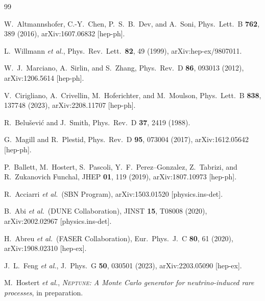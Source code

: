 \documentclass[
  aps,
  prl,
  twocolumn,
  superscriptaddress,
  amsmath, amssymb,
  floatfix, nofootinbib,
  longbibliography,
]{revtex4-2}
\newcommand{\Neptune}{\textsc{Neptune}}
\begin{document}
\begin{thebibliography}{99}

W.~Altmannshofer, C.-Y.~Chen, P.~S.~B.~Dev, and A.~Soni,
Phys.\ Lett.\ B \textbf{762}, 389 (2016),
arXiv:1607.06832 [hep-ph].

L.~Willmann \emph{et al.},
Phys.\ Rev.\ Lett.\ \textbf{82}, 49 (1999),
arXiv:hep-ex/9807011.

W.~J.~Marciano, A.~Sirlin, and S.~Zhang,
Phys.\ Rev.\ D \textbf{86}, 093013 (2012),
arXiv:1206.5614 [hep-ph].

V.~Cirigliano, A.~Crivellin, M.~Hoferichter, and M.~Moulson,
Phys.\ Lett.\ B \textbf{838}, 137748 (2023),
arXiv:2208.11707 [hep-ph].

R.~Belu\v{s}evi\'c and J.~Smith,
Phys.\ Rev.\ D \textbf{37}, 2419 (1988).

G.~Magill and R.~Plestid,
Phys.\ Rev.\ D \textbf{95}, 073004 (2017),
arXiv:1612.05642 [hep-ph].

P.~Ballett, M.~Hostert, S.~Pascoli, Y.~F.~Perez--Gonzalez,
Z.~Tabrizi, and R.~Zukanovich Funchal,
JHEP \textbf{01}, 119 (2019),
arXiv:1807.10973 [hep-ph].

R.~Acciarri \emph{et al.}\ (SBN Program),
arXiv:1503.01520 [physics.ins-det].

B.~Abi \emph{et al.}\ (DUNE Collaboration),
JINST \textbf{15}, T08008 (2020),
arXiv:2002.02967 [physics.ins-det].

H.~Abreu \emph{et al.}\ (FASER Collaboration),
Eur.\ Phys.\ J.\ C \textbf{80}, 61 (2020),
arXiv:1908.02310 [hep-ex].

J.~L.~Feng \emph{et al.},
J.\ Phys.\ G \textbf{50}, 030501 (2023),
arXiv:2203.05090 [hep-ex].

M.~Hostert \emph{et al.},
\emph{\Neptune: A Monte Carlo generator for neutrino-induced rare
processes}, in preparation.

\end{thebibliography}
\end{document}
